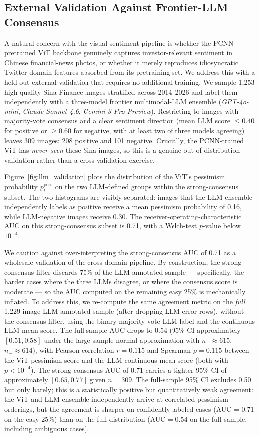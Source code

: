 \documentclass[AER]{AEA}
\begin{document}
\subsection{External Validation Against Frontier-LLM Consensus}
\label{sec:llm_validation}
A natural concern with the visual-sentiment pipeline is whether the PCNN-pretrained ViT backbone genuinely captures investor-relevant sentiment in Chinese financial-news photos, or whether it merely reproduces idiosyncratic Twitter-domain features absorbed from its pretraining set. We address this with a held-out external validation that requires no additional training. We sample 1{,}253 high-quality Sina Finance images stratified across 2014--2026 and label them independently with a three-model frontier multimodal-LLM ensemble (\textit{GPT-4o-mini}, \textit{Claude Sonnet 4.6}, \textit{Gemini 3 Pro Preview}). Restricting to images with majority-vote consensus and a clear sentiment direction (mean LLM score $\le 0.40$ for positive or $\ge 0.60$ for negative, with at least two of three models agreeing) leaves 309 images: 208 positive and 101 negative. Crucially, the PCNN-trained ViT has \textit{never seen} these Sina images, so this is a genuine out-of-distribution validation rather than a cross-validation exercise.

Figure~\ref{fig:llm_validation} plots the distribution of the ViT's pessimism probability $p_t^{\text{pess}}$ on the two LLM-defined groups within the strong-consensus subset. The two histograms are visibly separated: images that the LLM ensemble independently labels as positive receive a mean pessimism probability of 0.16, while LLM-negative images receive 0.30. The receiver-operating-characteristic AUC on this strong-consensus subset is 0.71, with a Welch-test $p$-value below $10^{-4}$.

We caution against over-interpreting the strong-consensus AUC of 0.71 as a wholesale validation of the cross-domain pipeline. By construction, the strong-consensus filter discards 75\% of the LLM-annotated sample --- specifically, the harder cases where the three LLMs disagree, or where the consensus score is moderate --- so the AUC computed on the remaining easy 25\% is mechanically inflated. To address this, we re-compute the same agreement metric on the \emph{full} 1{,}229-image LLM-annotated sample (after dropping LLM-error rows), without the consensus filter, using the binary majority-vote LLM label and the continuous LLM mean score. The full-sample AUC drops to 0.54 (95\% CI approximately $[0.51, 0.58]$ under the \citet{hanley1982meaning} large-sample normal approximation with $n_{+} \approx 615$, $n_{-} \approx 614$), with Pearson correlation $r=0.115$ and Spearman $\rho=0.115$ between the ViT pessimism score and the LLM continuous mean score (both with $p < 10^{-4}$). The strong-consensus AUC of 0.71 carries a tighter 95\% CI of approximately $[0.65, 0.77]$ given $n=309$. The full-sample 95\% CI excludes 0.50 but only barely; this is a statistically positive but quantitatively weak agreement: the ViT and LLM ensemble independently arrive at correlated pessimism orderings, but the agreement is sharper on confidently-labeled cases (AUC = 0.71 on the easy 25\%) than on the full distribution (AUC = 0.54 on the full sample, including ambiguous cases).
\end{document}
